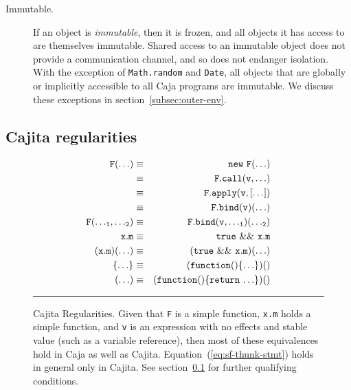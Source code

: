 \documentclass[letterpaper,twocolumn,10pt]{article}
\newcommand{\code}[1]{{\tt {#1}}}              %
\begin{document}
\begin{description}
  \item[Immutable.] If an object is \emph{immutable}, then it is frozen, and all objects it has access to are 
  themselves immutable. Shared access to an immutable object does not provide a communication channel, and so does 
  not endanger isolation. With the exception of \code{Math.random} and \code{Date}, all objects that are globally or 
  implicitly accessible to all Caja programs are immutable. We discuss these exceptions in 
  section~\ref{subsec:outer-env}.

\end{description}

\subsection{Cajita regularities}
\label{subsec:cajita-reg}

\begin{figure}
\begin{eqnarray}
  \code{F(\ldots)}                & \equiv & \code{new\ F(\ldots)}                     \label{eq:sf-new} \\
                                  & \equiv & \code{F.call(v,\ldots)}                   \label{eq:sf-call} \\
                                  & \equiv & \code{F.apply(v,[\ldots])}                \label{eq:sf-apply} \\
                                  & \equiv & \code{F.bind(v)(\ldots)}                  \label{eq:sf-bind-1} \\
  \code{F({\ldots}_1,{\ldots}_2)} & \equiv & \code{F.bind(v,{\ldots}_1)({\ldots}_2)}   \label{eq:sf-bind-n} \\
  \code{x.m}                      & \equiv & \code{true\ \&\&\ x.m}                    \label{eq:sf-true} \\
  \code{(x.m)(\ldots)}            & \equiv & \code{(true\ \&\&\ x.m)(\ldots)}          \label{eq:sf-true-call} \\
  \code{\{\ldots\}}               & \equiv & \code{(function()\{{\ldots\}})()}         \label{eq:sf-thunk-stmt} \\
  \code{(\ldots)}                 & \equiv & \code{(function()\{return\ {\ldots\}})()} \label{eq:sf-thunk-expr}
\end{eqnarray}

\caption[Cajita Regularities.]{Cajita Regularities. Given that \code{F} is a simple function, \code{x.m} holds a 
simple function, and \code{v} is an expression with no effects and stable value (such as a variable reference), then 
most of these equivalences hold in Caja as well as Cajita. Equation~(\ref{eq:sf-thunk-stmt}) 
holds in general only in Cajita. See section~\ref{subsec:cajita-reg} for further qualifying conditions. \\ } \hrule
\label{eqn:simple-func}
\end{figure}
\end{document}
